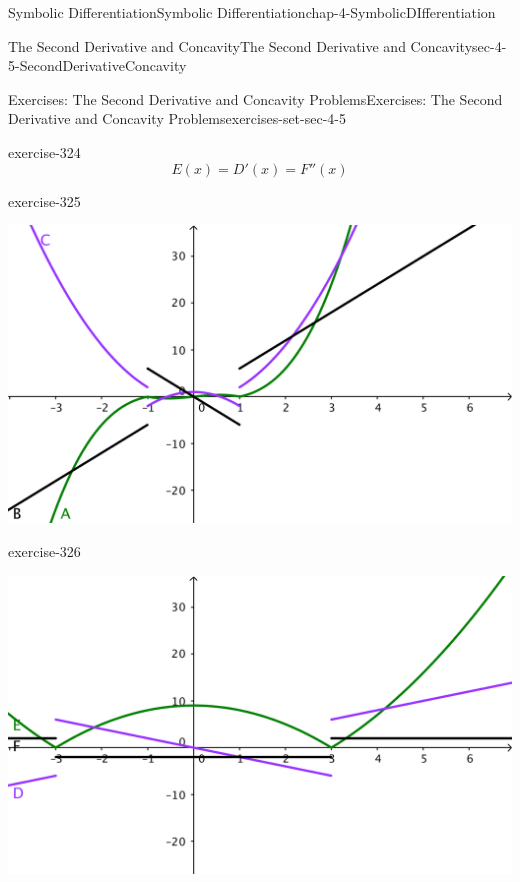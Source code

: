 \documentclass[oneside,10pt,]{book}
\numberwithin{equation}{section}
\begin{document}
\begin{chapterptx}{Symbolic Differentiation}{}{Symbolic Differentiation}{}{}{chap-4-SymbolicDIfferentiation}
\begin{sectionptx}{The Second Derivative and Concavity}{}{The Second Derivative and Concavity}{}{}{sec-4-5-SecondDerivativeConcavity}
\begin{exercises-subsection-numberless}{Exercises: The Second Derivative and Concavity Problems}{}{Exercises: The Second Derivative and Concavity Problems}{}{}{exercises-set-sec-4-5}
\begin{exercisegroup}
\begin{divisionexerciseeg}{11}{}{}{exercise-324}
%
\begin{equation*}
E(x) = D'(x)=F''(x)
\end{equation*}
\end{divisionexerciseeg}%
\begin{divisionexerciseeg}{12}{}{}{exercise-325}%
\hypertarget{p-1847}{}%
\leavevmode%
\begin{sidebyside}{1}{0.25}{0.25}{0}%
\begin{sbspanel}{0.5}%
\includegraphics[width=1\linewidth]{images/sec4-5-e3.png}
\end{sbspanel}%
\end{sidebyside}%
%
\end{divisionexerciseeg}%
\begin{divisionexerciseeg}{13}{}{}{exercise-326}%
\hypertarget{p-1848}{}%
\leavevmode%
\begin{sidebyside}{1}{0.25}{0.25}{0}%
\begin{sbspanel}{0.5}%
\includegraphics[width=1\linewidth]{images/sec4-5-e4.png}
\end{sbspanel}%
\end{sidebyside}%

\end{divisionexerciseeg}
\end{exercisegroup}
\end{exercises-subsection-numberless}
\end{sectionptx}
\end{chapterptx}
\end{document}

